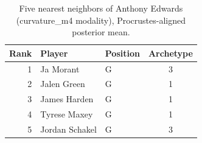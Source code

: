 \begin{table}[htbp]
  \centering\small
  \begin{tabular}{rllc}
    \toprule
    Rank & Player & Position & Archetype \\
    \midrule
    1 & Ja Morant & G & 3 \\
    2 & Jalen Green & G & 1 \\
    3 & James Harden & G & 1 \\
    4 & Tyrese Maxey & G & 1 \\
    5 & Jordan Schakel & G & 3 \\
    \bottomrule
  \end{tabular}
  \caption{Five nearest neighbors of Anthony Edwards (curvature_m4 modality), Procrustes-aligned posterior mean.}
  \label{tab:Anthony_Edwards_neighbors_curvature_m4}
\end{table}

